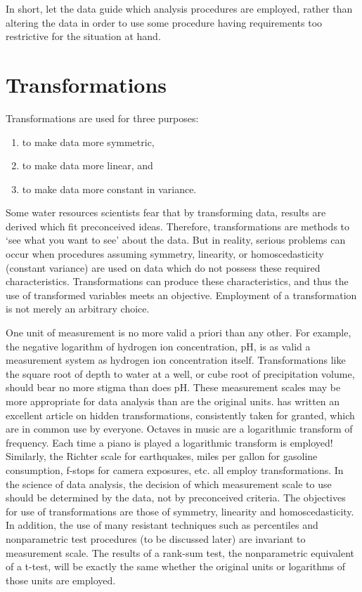 \documentclass[]{book}
\providecommand{\tightlist}{%
  \setlength{\itemsep}{0pt}\setlength{\parskip}{0pt}}
\begin{document}
In short, let the data guide which analysis procedures are employed, rather than altering the data in order to use some procedure having requirements too restrictive for the situation at hand.

\hypertarget{transformations}{%
\section{Transformations}\label{transformations}}

Transformations are used for three purposes:

\begin{enumerate}
\def\labelenumi{\arabic{enumi}.}
\tightlist
\item
  to make data more symmetric,
\item
  to make data more linear, and
\item
  to make data more constant in variance.
\end{enumerate}

Some water resources scientists fear that by transforming data, results are derived which fit preconceived ideas. Therefore, transformations are methods to `see what you want to see' about the data. But in reality, serious problems can occur when procedures assuming symmetry, linearity, or homoscedasticity (constant variance) are used on data which do not possess these required characteristics. Transformations can produce these characteristics, and thus the use of transformed variables meets an objective. Employment of a transformation is not merely an arbitrary choice.

One unit of measurement is no more valid a priori than any other. For example, the negative logarithm of hydrogen ion concentration, pH, is as valid a measurement system as hydrogen ion concentration itself. Transformations like the square root of depth to water at a well, or cube root of precipitation volume, should bear no more stigma than does pH. These measurement scales may be more appropriate for data analysis than are the original units. \citet{hoaglin_transformations_1988} has written an excellent article on hidden transformations, consistently taken for granted, which are in common use by everyone. Octaves in music are a logarithmic transform of frequency. Each time a piano is played a logarithmic transform is employed! Similarly, the Richter scale for earthquakes, miles per gallon for gasoline consumption, f-stops for camera exposures, etc. all employ transformations. In the science of data analysis, the decision of which measurement scale to use should be determined by the data, not by preconceived criteria. The objectives for use of transformations are those of symmetry, linearity and homoscedasticity. In addition, the use of many resistant techniques such as percentiles and nonparametric test procedures (to be discussed later) are invariant to measurement scale. The results of a rank-sum test, the nonparametric equivalent of a t-test, will be exactly the same whether the original units or logarithms of those units are employed.
\end{document}
